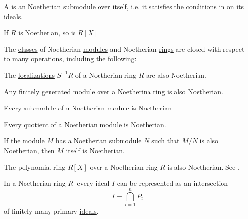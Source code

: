 \begin{definition}\label{def:noetherian_ring}
  A  is an Noetherian submodule over itself, i.e. it satisfies the conditions in  on its ideals.
\end{definition}

\begin{theorem}\label{thm:hilberts_basis_theorem}\cite[418]{Knapp2016BAlg}
  If \( R \) is Noetherian, so is \( R[X] \).
\end{theorem}

\begin{theorem}\label{thm:noetherian_rings_closed_under}
  The \hyperref[def:set_zfc]{classes} of Noetherian \hyperref[def:noetherian_module]{modules} and Noetherian \hyperref[def:noetherian_ring]{rings} are closed with respect to many operations, including the following:

  \begin{defenum}
    \cite[corollary 8.48]{Knapp2016BAlg} The \hyperref[def:ring_localization]{localizations} \( S^{-1} R \) of a Noetherian ring \( R \) are also Noetherian.

    \cite[proposition 8.34]{Knapp2016BAlg} Any finitely generated \hyperref[def:free_left_module]{module} over a Noetherina ring is also \hyperref[def:noetherian_module]{Noetherian}.

    \cite[proposition 6.3(а)]{Коцев2016} Every submodule of a Noetherian module is Noetherian.

    \cite[proposition 6.3(a)]{Коцев2016} Every quotient of a Noetherian module is Noetherian.

    \cite[proposition 6.3(b)]{Коцев2016} If the module \( M \) has a Noetherian submodule \( N \) such that \( M / N \) is also Noetherian, then \( M \) itself is Noetherian.

     The polynomial ring \( R[X] \) over a Noetherian ring \( R \) is also Noetherian. See .
  \end{defenum}
\end{theorem}

\begin{theorem}\label{thm:primary_decomposition}\cite[theorem 10.6]{Коцев2016}
  In a Noetherian ring \( R \), every ideal \( I \) can be represented as an intersection
  \begin{equation*}
    I = \bigcap_{i=1}^n P_i
  \end{equation*}
  of finitely many primary \hyperref[def:primary_ring_ideal]{ideals}.
\end{theorem}
